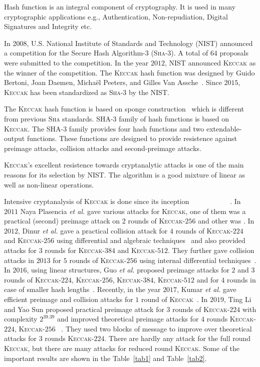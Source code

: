 \documentclass[runningheads]{llncs}
\newcommand{\KECCAK}{\mbox{\textsc{Keccak}}}
\newcommand{\Keccak}{\mbox{\textsc{Keccak}}}
\newcommand{\SHA}{\textsc{Sha}}
\newcommand{\etal}{\textit{et al. }}
\begin{document}
Hash function is an integral component of cryptography. It is used in many cryptographic applications e.g., Authentication, Non-repudiation, Digital Signatures and Integrity etc.

In 2008, U.S. National Institute of Standards and Technology (NIST) announced a competition for the Secure Hash Algorithm-3 (\SHA-3). A total of $64$ proposals were submitted to the competition. In the year $2012$, NIST announced \KECCAK{} as the winner of the competition. The \KECCAK{} hash function was designed by Guido Bertoni, Joan Daemen, Micha\"{e}l Peeters, and Gilles Van Assche~\cite{bertoni2009keccak}. Since $2015$, \KECCAK{} has been standardized as \SHA-$3$ by the NIST.

The \KECCAK{} hash function is based on sponge construction~\cite{bertoni2011cryptographic} which is different from previous \SHA{} standards. SHA-3 family of hash functions is based on \Keccak{}. The SHA-3 family provides four hash functions and two extendable-output functions. These functions are designed to provide resistence against preimage attacks, collision attacks and second-preimage attacks.

\Keccak{}'s excellent resistence towards cryptanalytic attacks is one of the main reasons for its selection by NIST. The algorithm is a good mixture of linear as well as non-linear operations.

Intensive cryptanalysis of \KECCAK{} is done since its inception ~\cite{bernstein2010second}~\cite{naya2011practical}~\cite{dinur2012new}~\cite{dinur2013collision}~\cite{morawiecki2013sat}~\cite{dinur2014improved}~\cite{chang20141st}~\cite{guo2016linear}~\cite{qiao2017new}~\cite{song2017non}~\cite{kumar2018cryptanalysis}. In $2011$ Naya Plasencia \etal gave various attacks for \KECCAK{}, one of them was a practical (second) preimage attack on 2 rounds of \KECCAK-$256$ and other was . In $2012$, Dinur \etal gave a practical collision attack for $4$ rounds of \KECCAK-$224$ and \KECCAK-$256$ using differential and algebraic techniques~\cite{dinur2012new} and also provided attacks for $3$ rounds for \KECCAK-$384$ and \KECCAK-$512$. They further gave collision attacks in $2013$ for $5$ rounds of \KECCAK-$256$ using internal differential techniques~\cite{dinur2013collision}. In $2016$, using linear structures, Guo \etal proposed preimage attacks for $2$ and $3$ rounds of \KECCAK-$224$, \KECCAK-$256$, \KECCAK-$384$, \KECCAK-$512$ and for $4$ rounds in case of smaller hash lengths~\cite{guo2016linear}. Recently, in the year $2017$, Kumar \etal gave efficient preimage and collision attacks for $1$ round of \KECCAK~\cite{kumar2018cryptanalysis}. In $2019$, Ting Li and Yao Sun proposed practical preimage attack for $3$ rounds of \KECCAK-$224$ with complexity $2^{39.39}$ and improved theoretical preimage attacks for $4$ rounds \KECCAK-$224$, \KECCAK-$256$ ~\cite{todo}. They used two blocks of message to improve over theoretical attacks for $3$ rounds \KECCAK-$224$. There are hardly any attack for the full round \KECCAK{}, but there are many attacks for reduced round \Keccak{}. Some of the important results are shown in the Table~\ref{tab1} and Table~\ref{tab2}.
\end{document}
